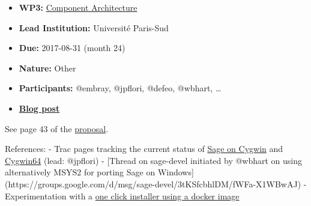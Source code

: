 \begin{itemize}
\tightlist
\item
  \textbf{WP3:}
  \href{https://github.com/OpenDreamKit/OpenDreamKit/tree/master/WP3}{Component
  Architecture}
\item
  \textbf{Lead Institution:} Université Paris-Sud
\item
  \textbf{Due:} 2017-08-31 (month 24)
\item
  \textbf{Nature:} Other
\item
  \textbf{Participants:} @embray, @jpflori, @defeo, @wbhart, \ldots{}
\item
  \textbf{\href{http://opendreamkit.org/2017/10/11/SageWindows/}{Blog
  post}}
\end{itemize}

See page 43 of the
\href{https://github.com/OpenDreamKit/OpenDreamKit/raw/master/Proposal/proposal-www.pdf}{proposal}.

References: - Trac pages tracking the current status of
\href{http://trac.sagemath.org/wiki/CygwinPort}{Sage on Cygwin} and
\href{http://trac.sagemath.org/wiki/Cygwin64Port}{Cygwin64} (lead:
@jpflori) - {[}Thread on sage-devel initiated by @wbhart on using
alternatively MSYS2 for porting Sage on
Windows{]}(https://groups.google.com/d/msg/sage-devel/3tKSfcbhlDM/fWFa-X1WBwAJ)
- Experimentation with a
\href{https://github.com/sagemath/docker-images/issues/1}{one click
installer using a docker image}
